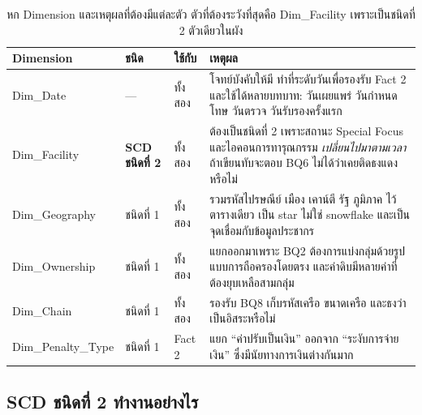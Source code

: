 \documentclass[11pt,a4paper]{article}
\newcommand{\sansall}{\sffamily}
\begin{document}
\begin{table}[H]\centering\small
\begin{tabular}{L{3.4cm} L{2.0cm} L{1.9cm} L{7.4cm}}
\toprule
\sansall\bfseries Dimension & \sansall\bfseries ชนิด &
\sansall\bfseries ใช้กับ & \sansall\bfseries เหตุผล \\
\midrule
Dim\_Date & --- & ทั้งสอง &
  โจทย์บังคับให้มี ทำที่ระดับวันเพื่อรองรับ Fact 2 และใช้ได้หลายบทบาท:
  วันเผยแพร่ วันกำหนดโทษ วันตรวจ วันรับรองครั้งแรก \\
\addlinespace
Dim\_Facility & \textbf{SCD ชนิดที่ 2} & ทั้งสอง &
  ต้องเป็นชนิดที่ 2 เพราะสถานะ Special Focus และไอคอนการทารุณกรรม
  \emph{เปลี่ยนไปมาตามเวลา} ถ้าเขียนทับจะตอบ BQ6 ไม่ได้ว่าเคยติดธงแดงหรือไม่ \\
\addlinespace
Dim\_Geography & ชนิดที่ 1 & ทั้งสอง &
  รวมรหัสไปรษณีย์ เมือง เคาน์ตี รัฐ ภูมิภาค ไว้ตารางเดียว
  เป็น star ไม่ใช่ snowflake และเป็นจุดเชื่อมกับข้อมูลประชากร \\
\addlinespace
Dim\_Ownership & ชนิดที่ 1 & ทั้งสอง &
  แยกออกมาเพราะ BQ2 ต้องการแบ่งกลุ่มด้วยรูปแบบการถือครองโดยตรง
  และค่าดิบมีหลายค่าที่ต้องยุบเหลือสามกลุ่ม \\
\addlinespace
Dim\_Chain & ชนิดที่ 1 & ทั้งสอง &
  รองรับ BQ8 เก็บรหัสเครือ ขนาดเครือ และธงว่าเป็นอิสระหรือไม่ \\
\addlinespace
Dim\_Penalty\_Type & ชนิดที่ 1 & Fact 2 &
  แยก ``ค่าปรับเป็นเงิน'' ออกจาก ``ระงับการจ่ายเงิน'' ซึ่งมีนัยทางการเงินต่างกันมาก \\
\bottomrule
\end{tabular}
\caption{หก Dimension และเหตุผลที่ต้องมีแต่ละตัว ตัวที่ต้องระวังที่สุดคือ Dim\_Facility เพราะเป็นชนิดที่ 2 ตัวเดียวในผัง}
\end{table}

\subsection{SCD ชนิดที่ 2 ทำงานอย่างไร}
\end{document}
